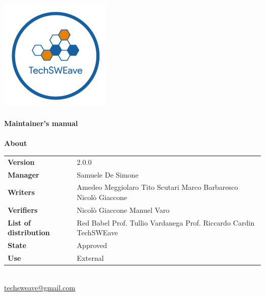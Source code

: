\documentclass[a4paper]{article}
\begin{document}
\begin{titlepage}
    \begin{center}
        \includegraphics{../../../../Images/logo.png}\\
        \vspace{20px}
        \textcolor{logo}{\hrulefill}\\
        \vspace{20px}
        \textbf{\huge\textcolor{logo}{Maintainer's manual}}\\
        \vspace{10px}
        \textcolor{logo}{\hrulefill}\\
        \vspace{40px}
        \textbf{\Large About}\\
        \vspace{20px}
        \begin{tabular}{p{100px} | p{100px}}
            \textbf{Version}              & 2.0.0                                                                                        \\
            \textbf{Manager}              & Samuele De Simone                                                                            \\
            \textbf{Writers}              & Amedeo Meggiolaro \newline Tito Scutari \newline Marco Barbaresco \newline Nicolò Giaccone   \\
            \textbf{Verifiers}            & Nicolò Giaccone \newline Manuel Varo                                                         \\
            \textbf{List of distribution} & Red Babel \newline Prof. Tullio Vardanega \newline Prof. Riccardo Cardin \newline TechSWEave \\
            \textbf{State}                & Approved                                                                                     \\
            \textbf{Use}                  & External                                                                                     \\
        \end{tabular}\\
        \vspace{60px}
        \href{mailto:techsweave@gmail.com}{techsweave@gmail.com}\\


\end{center}
\end{titlepage}
\end{document}
